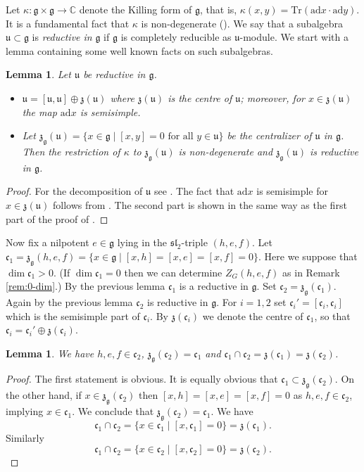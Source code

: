 \documentclass[a4paper,10pt]{amsart}
\newcommand{\C}{\mathbb{C}}
\newcommand{\mf}{\mathfrak}
\newcommand{\g}{\mf{g}}
\newcommand{\ssl}{\mf{sl}}
\newcommand{\uu}{\mf{u}}
\renewcommand{\c}{\mf{c}}
\newcommand{\z}{\mf{z}}
\newcommand{\ad}{\mathrm{ad}}
\numberwithin{equation}{section}
\newtheorem{lemma}[theorem]{Lemma}
\theoremstyle{remark}
\theoremstyle{remark}
\begin{document}
Let $\kappa : \g\times\g\to \C$ denote the Killing form of $\g$, that is,
$\kappa(x,y) = \mathrm{Tr}(\ad x \cdot \ad y )$. It is a fundamental fact that
$\kappa$ is non-degenerate (\cite[Theorem 5.1]{hum}). 
We say that
a subalgebra $\uu\subset \g$ is {\em reductive in } $\g$ if $\g$ is completely
reducible as $\uu$-module. We start with a lemma containing some well known
facts on such subalgebras.

\begin{lemma}\label{lemred}
Let $\uu$ be reductive in $\g$.
\begin{itemize}
\item $\uu = [\uu,\uu]\oplus\z(\uu)$ where $\z(\uu)$ is the centre of $\uu$;
  moreover, for $x\in \z(\uu)$ the map $\ad x$ is semisimple.
\item Let $\z_\g(\uu) = \{ x\in \g \mid [x,y]=0 \text{ for all } y\in \uu\}$
  be the centralizer of $\uu$ in $\g$. Then the restriction of $\kappa$
  to $\z_\g(\uu)$ is non-degenerate and $\z_\g(\uu)$ is reductive in $\g$.
\end{itemize}  
\end{lemma}

\begin{proof}
For the decomposition of $\uu$ see \cite[Proposition 2.12.2]{gra16}. The
fact that $\ad x$ is semisimple for $x\in \z(\uu)$ follows from
\cite[Chapter III, Theorem 10]{jac}. The second part is shown in the same
way as the first part of the proof of \cite[Lemma 8.3.9]{gra16}.
\end{proof}  

Now fix a nilpotent $e\in \g$ lying in the $\ssl_2$-triple $(h,e,f)$.
Let $\c_1 = \z_\g(h,e,f) = \{x\in \g\mid [x,h]=[x,e]=[x,f]=0\}$. Here we
suppose that $\dim \c_1 >0$. (If $\dim \c_1=0$ then we can determine
$Z_G(h,e,f)$ as in Remark \ref{rem:0-dim}.)
By the previous lemma $\c_1$ is a reductive in $\g$. Set $\c_2 = \z_\g(\c_1)$.
Again by the previous lemma $\c_2$ is reductive in $\g$. For $i=1,2$ set
$\c_i' = [\c_i,\c_i]$ which is
the semisimple part of $\c_i$. By $\z(\c_i)$ we denote the centre of $\c_1$, so
that $\c_i = \c_i'\oplus \z(\c_i)$. 

\begin{lemma}\label{lem0}
We have $h,e,f\in \c_2$, $\z_\g(\c_2) = \c_1$ and $\c_1\cap\c_2 = \z(\c_1)
=\z(\c_2)$.   
\end{lemma}

\begin{proof}
The first statement is obvious. It is equally obvious that $\c_1\subset
\z_\g(\c_2)$. On the other hand, if $x\in \z_\g(\c_2)$ then $[x,h]=[x,e]=
[x,f]=0$ as $h,e,f\in \c_2$, implying $x\in \c_1$. We conclude that
$\z_\g(\c_2) = \c_1$. We have
$$\c_1\cap\c_2 = \{ x\in \c_1 \mid [x,\c_1]=0\} = \z(\c_1).$$
Similarly
$$\c_1\cap\c_2 = \{ x\in \c_2 \mid [x,\c_2]=0\} = \z(\c_2).$$
\end{proof}  
\end{document}
